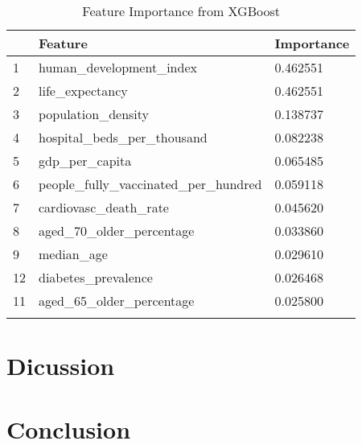 \documentclass[10pt, a4paper, twocolumn]{article} %
\begin{document}
\begin{table}
	\caption{Feature Importance from XGBoost}
	\centering
	\begin{tabular}{lll}
		\toprule
		& \textbf{Feature} & \textbf{Importance} \\
		\midrule
		1&human\_development\_index & 0.462551 \\
		2& life\_expectancy& 0.462551\\
		3& population\_density& 0.138737\\
		4& hospital\_beds\_per\_thousand& 0.082238\\
		5& gdp\_per\_capita& 0.065485\\
		6& people\_fully\_vaccinated\_per\_hundred& 0.059118\\
		7& cardiovasc\_death\_rate& 0.045620\\
		8& aged\_70\_older\_percentage& 0.033860\\
		9& median\_age& 0.029610\\
		12& diabetes\_prevalence& 0.026468\\
		11& aged\_65\_older\_percentage& 0.025800\\
		\bottomrule
	\label{tab:feature_importance}
	\end{tabular}
\end{table}
\section{Dicussion}\label{sec:discussion}

\section{Conclusion}

\printbibliography[title={Bibliography}] %

\end{document}
